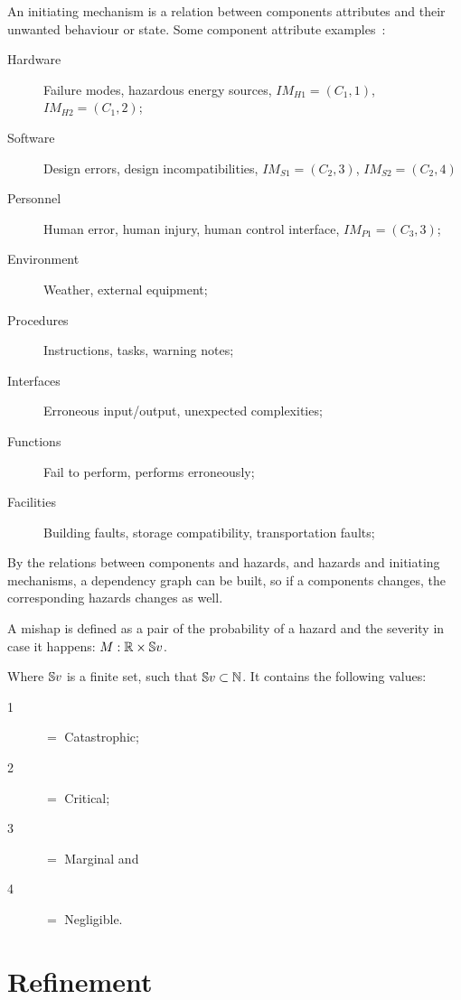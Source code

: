 \begin{definition}
An initiating mechanism is a relation between components attributes and their unwanted behaviour or state. 
%
Some component attribute examples~\cite{EricsonII2005}:
\begin{description}
  \item[Hardware] Failure modes, hazardous energy sources, $IM_{H1}=\left(C_1,1\right)$, $IM_{H2}=\left(C_1,2\right)$;
  \item[Software] Design errors, design incompatibilities, $IM_{S1}=\left(C_2,3\right)$, $IM_{S2}=\left(C_2,4\right)$
  \item[Personnel] Human error, human injury, human control interface, $IM_{P1}=\left(C_3,3\right)$;
  \item[Environment] Weather, external equipment;
  \item[Procedures] Instructions, tasks, warning notes;
  \item[Interfaces] Erroneous input/output, unexpected complexities;
  \item[Functions] Fail to perform, performs erroneously;
  \item[Facilities] Building faults, storage compatibility, transportation faults;
\end{description}
\end{definition}

By the relations between components and hazards, and hazards and initiating mechanisms, a dependency graph can be built, so if a components changes, the corresponding hazards changes as well.

\begin{definition}[Mishap]
A mishap is defined as a pair of the probability of a hazard and the severity in case it happens: $M: \mathbb{R}\times\mathbb{S}v$.
\end{definition}
%
\noindent Where $\mathbb{S}v$ is a finite set, such that $\mathbb{S}v \subset \mathbb{N}$. It contains the following values:
\begin{description}
  \item[1] $=$ Catastrophic;
  \item[2] $=$ Critical;
  \item[3] $=$ Marginal and
  \item[4] $=$ Negligible.
\end{description}

\section{Refinement}

